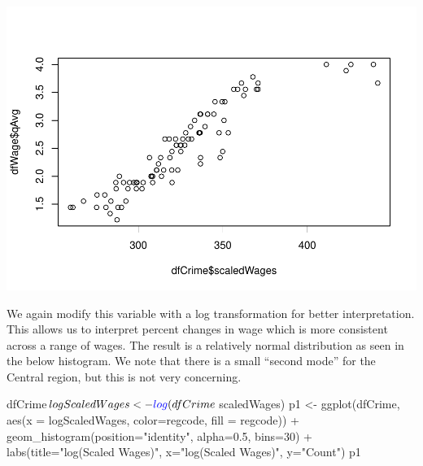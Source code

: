 \documentclass[]{article}
\newenvironment{Shaded}{}{}
\newcommand{\DataTypeTok}[1]{#1}
\newcommand{\DecValTok}[1]{#1}
\newcommand{\FloatTok}[1]{#1}
\newcommand{\KeywordTok}[1]{\textcolor[rgb]{0.00,0.00,1.00}{#1}}
\newcommand{\NormalTok}[1]{#1}
\newcommand{\OperatorTok}[1]{#1}
\newcommand{\StringTok}[1]{\textcolor[rgb]{0.00,0.50,0.50}{#1}}
\begin{document}
\includegraphics{Bagnard_Gaustad_Hartman_Leung_Lab_3_files/figure-latex/unnamed-chunk-54-1.pdf}

We again modify this variable with a log transformation for better
interpretation. This allows us to interpret percent changes in wage
which is more consistent across a range of wages. The result is a
relatively normal distribution as seen in the below histogram. We note
that there is a small ``second mode'' for the Central region, but this
is not very concerning.

\begin{Shaded}
\begin{Highlighting}[]
\NormalTok{dfCrime}\OperatorTok{$}\NormalTok{logScaledWages <-}\StringTok{ }\KeywordTok{log}\NormalTok{(dfCrime}\OperatorTok{$}\NormalTok{scaledWages)}
\NormalTok{p1 <-}\StringTok{ }\KeywordTok{ggplot}\NormalTok{(dfCrime, }\KeywordTok{aes}\NormalTok{(}\DataTypeTok{x =}\NormalTok{ logScaledWages, }\DataTypeTok{color=}\NormalTok{regcode, }\DataTypeTok{fill =}\NormalTok{ regcode)) }\OperatorTok{+}
\StringTok{  }\KeywordTok{geom_histogram}\NormalTok{(}\DataTypeTok{position=}\StringTok{"identity"}\NormalTok{, }\DataTypeTok{alpha=}\FloatTok{0.5}\NormalTok{, }\DataTypeTok{bins=}\DecValTok{30}\NormalTok{) }\OperatorTok{+}
\StringTok{  }\KeywordTok{labs}\NormalTok{(}\DataTypeTok{title=}\StringTok{"log(Scaled Wages)"}\NormalTok{, }\DataTypeTok{x=}\StringTok{"log(Scaled Wages)"}\NormalTok{, }\DataTypeTok{y=}\StringTok{"Count"}\NormalTok{)}
\NormalTok{p1}
\end{Highlighting}
\end{Shaded}
\end{document}
